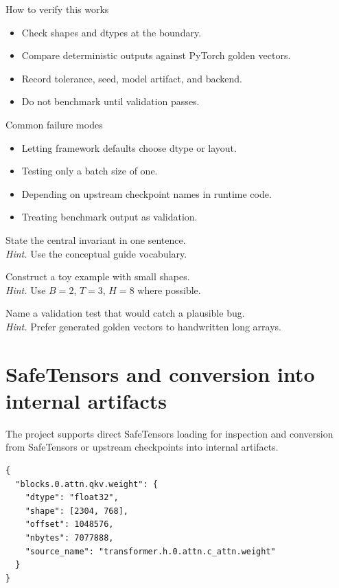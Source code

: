 \begin{verificationbox}{How to verify this works}
\begin{itemize}
\item Check shapes and dtypes at the boundary.
\item Compare deterministic outputs against PyTorch golden vectors.
\item Record tolerance, seed, model artifact, and backend.
\item Do not benchmark until validation passes.
\end{itemize}
\end{verificationbox}

\begin{warningbox}{Common failure modes}
\begin{itemize}
\item Letting framework defaults choose dtype or layout.
\item Testing only a batch size of one.
\item Depending on upstream checkpoint names in runtime code.
\item Treating benchmark output as validation.
\end{itemize}
\end{warningbox}

\begin{chapterexercises}
\item State the central invariant in one sentence.\\
\textit{Hint.} Use the conceptual guide vocabulary.
\item Construct a toy example with small shapes.\\
\textit{Hint.} Use $B=2$, $T=3$, $H=8$ where possible.
\item Name a validation test that would catch a plausible bug.\\
\textit{Hint.} Prefer generated golden vectors to handwritten long arrays.
\end{chapterexercises}

\chapter{SafeTensors and conversion into internal artifacts}
\label{ch:safetensors-conversion}
The project supports direct SafeTensors loading for inspection and conversion from SafeTensors or upstream checkpoints into internal artifacts. \citep{safetensorsDocs}



\begin{lstlisting}[caption={Schematic weights.index.json entry.}]
{
  "blocks.0.attn.qkv.weight": {
    "dtype": "float32",
    "shape": [2304, 768],
    "offset": 1048576,
    "nbytes": 7077888,
    "source_name": "transformer.h.0.attn.c_attn.weight"
  }
}
\end{lstlisting}


